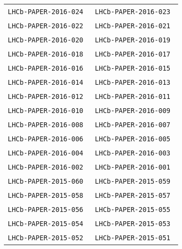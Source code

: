 \begin{center}
\begin{longtable}{ll}
\texttt{LHCb-PAPER-2016-024}~\cite{LHCb-PAPER-2016-024} &
\texttt{LHCb-PAPER-2016-023}~\cite{LHCb-PAPER-2016-023} \\
\texttt{LHCb-PAPER-2016-022}~\cite{LHCb-PAPER-2016-022} &
\texttt{LHCb-PAPER-2016-021}~\cite{LHCb-PAPER-2016-021} \\
\texttt{LHCb-PAPER-2016-020}~\cite{LHCb-PAPER-2016-020} &
\texttt{LHCb-PAPER-2016-019}~\cite{LHCb-PAPER-2016-019} \\
\texttt{LHCb-PAPER-2016-018}~\cite{LHCb-PAPER-2016-018} &
\texttt{LHCb-PAPER-2016-017}~\cite{LHCb-PAPER-2016-017} \\
\texttt{LHCb-PAPER-2016-016}~\cite{LHCb-PAPER-2016-016} &
\texttt{LHCb-PAPER-2016-015}~\cite{LHCb-PAPER-2016-015} \\
\texttt{LHCb-PAPER-2016-014}~\cite{LHCb-PAPER-2016-014} &
\texttt{LHCb-PAPER-2016-013}~\cite{LHCb-PAPER-2016-013} \\
\texttt{LHCb-PAPER-2016-012}~\cite{LHCb-PAPER-2016-012} &
\texttt{LHCb-PAPER-2016-011}~\cite{LHCb-PAPER-2016-011} \\
\texttt{LHCb-PAPER-2016-010}~\cite{LHCb-PAPER-2016-010} &
\texttt{LHCb-PAPER-2016-009}~\cite{LHCb-PAPER-2016-009} \\
\texttt{LHCb-PAPER-2016-008}~\cite{LHCb-PAPER-2016-008} &
\texttt{LHCb-PAPER-2016-007}~\cite{LHCb-PAPER-2016-007} \\
\texttt{LHCb-PAPER-2016-006}~\cite{LHCb-PAPER-2016-006} &
\texttt{LHCb-PAPER-2016-005}~\cite{LHCb-PAPER-2016-005} \\
\texttt{LHCb-PAPER-2016-004}~\cite{LHCb-PAPER-2016-004} &
\texttt{LHCb-PAPER-2016-003}~\cite{LHCb-PAPER-2016-003} \\
\texttt{LHCb-PAPER-2016-002}~\cite{LHCb-PAPER-2016-002} &
\texttt{LHCb-PAPER-2016-001}~\cite{LHCb-PAPER-2016-001} \\
\hline
\texttt{LHCb-PAPER-2015-060}~\cite{LHCb-PAPER-2015-060} &
\texttt{LHCb-PAPER-2015-059}~\cite{LHCb-PAPER-2015-059} \\
\texttt{LHCb-PAPER-2015-058}~\cite{LHCb-PAPER-2015-058} &
\texttt{LHCb-PAPER-2015-057}~\cite{LHCb-PAPER-2015-057} \\
\texttt{LHCb-PAPER-2015-056}~\cite{LHCb-PAPER-2015-056} &
\texttt{LHCb-PAPER-2015-055}~\cite{LHCb-PAPER-2015-055} \\
\texttt{LHCb-PAPER-2015-054}~\cite{LHCb-PAPER-2015-054} &
\texttt{LHCb-PAPER-2015-053}~\cite{LHCb-PAPER-2015-053} \\
\texttt{LHCb-PAPER-2015-052}~\cite{LHCb-PAPER-2015-052} &
\texttt{LHCb-PAPER-2015-051}~\cite{LHCb-PAPER-2015-051} \\

\end{longtable}
\end{center}
